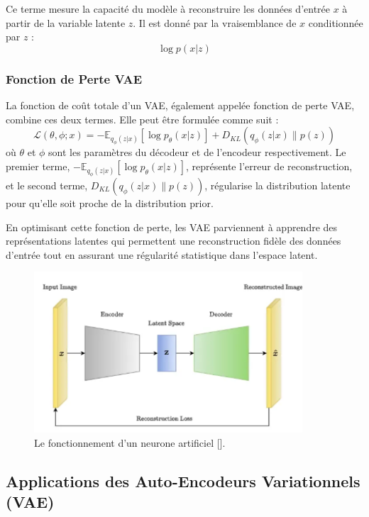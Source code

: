 Ce terme mesure la capacité du modèle à reconstruire les données d'entrée \( x
\) à partir de la variable latente \( z \). Il est donné par la vraisemblance
de \( x \) conditionnée par \( z \) :
\[
	\log p(x | z)
\]

\subsubsection*{Fonction de Perte VAE}

La fonction de coût totale d'un VAE, également appelée fonction de perte VAE,
combine ces deux termes. Elle peut être formulée comme suit :
\[
	\mathcal{L}(\theta, \phi; x) = - \mathbb{E}_{q_\phi(z | x)}[\log p_\theta(x | z)] + D_{KL}(q_\phi(z | x) \parallel p(z))
\]
où \( \theta \) et \( \phi \) sont les paramètres du décodeur et de l'encodeur
respectivement. Le premier terme, \( - \mathbb{E}_{q_\phi(z | x)}[\log
	p_\theta(x | z)] \), représente l'erreur de reconstruction, et le second terme,
\( D_{KL}(q_\phi(z | x) \parallel p(z)) \), régularise la distribution latente
pour qu'elle soit proche de la distribution prior.

En optimisant cette fonction de perte, les VAE parviennent à apprendre des
représentations latentes qui permettent une reconstruction fidèle des données
d'entrée tout en assurant une régularité statistique dans l'espace latent.

\begin{figure}[hbt!]
	\centering
	\includegraphics[width=10cm]{images_pfe/vae_1.png}
	\caption{Le fonctionnement d'un neurone artificiel [\cite{kingma_welling_auto_encoding}].}
	\label{fig:VAE}
\end{figure}

\subsection{Applications des Auto-Encodeurs Variationnels (VAE)}

